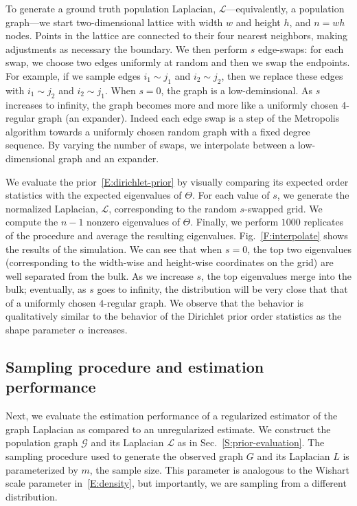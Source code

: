 \documentclass[12pt]{article}
\theoremstyle{plain}
\begin{document}
To generate a ground truth population Laplacian, $\mathcal{L}$---equivalently, a
population graph---we start two-dimensional lattice with width $w$ and
height $h$, and $n = w h$ nodes.  Points in the lattice are connected
to their four nearest neighbors, making adjustments as necessary the
boundary.  We then perform $s$ edge-swaps: for each swap, we choose
two edges uniformly at random and then we swap the endpoints.  For
example, if we sample edges $i_1 \sim j_1$ and $i_2 \sim j_2$, then we
replace these edges with $i_1 \sim j_2$ and $i_2 \sim j_1$.  When
$s = 0$, the graph is a low-deminsional.  As $s$ increases to
infinity, the graph becomes more and more like a uniformly chosen
$4$-regular graph (an expander).  Indeed each edge swap is a step of
the Metropolis algorithm towards a uniformly chosen random graph with
a fixed degree sequence.  By varying the number of swaps,
we interpolate between a low-dimensional graph and an expander.


We evaluate the prior~\eqref{E:dirichlet-prior} by visually comparing
its expected order statistics with the expected eigenvalues of
$\Theta$.  For each value of $s$, we generate the normalized
Laplacian, $\mathcal{L}$, corresponding to the random $s$-swapped
grid.  We compute the $n-1$ nonzero eigenvalues of $\Theta$.  Finally,
we perform $1000$ replicates of the procedure and average the
resulting eigenvalues.  Fig.~\ref{F:interpolate} shows the results of
the simulation.  We can see that when $s = 0$, the top two eigenvalues
(corresponding to the width-wise and height-wise coordinates on the
grid) are well separated from the bulk.  As we increase $s$, the top
eigenvalues merge into the bulk; eventually, as $s$ goes to infinity,
the distribution will be very close that that of a uniformly chosen
$4$-regular graph.  We observe that the behavior is qualitatively
similar to the behavior of the Dirichlet prior order statistics as the
shape parameter $\alpha$ increases.


\subsection{Sampling procedure and estimation performance}\label{S:estimation}

Next, we evaluate the estimation performance of a regularized
estimator of the graph Laplacian as compared to an unregularized
estimate.  We construct the population graph $\mathcal{G}$ and its
Laplacian $\mathcal{L}$ as in Sec.~\ref{S:prior-evaluation}.  The
sampling procedure used to generate the observed graph $G$ and its
Laplacian $L$ is parameterized by $m$, the sample size.  This
parameter is analogous to the Wishart scale parameter
in~\eqref{E:density}, but importantly, we are sampling from a
different distribution.
\end{document}

